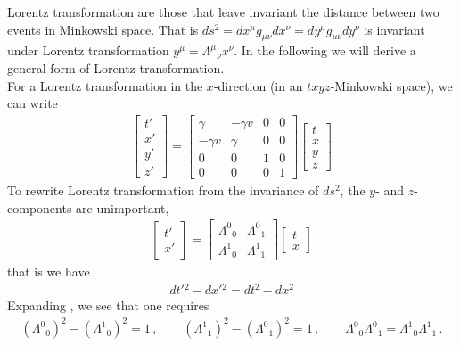 \documentclass[11pt, onesided]{book}
\theoremstyle{break}
\theoremstyle{break}
\newcommand{\bmat}[1]{\begin{bmatrix} #1 \end{bmatrix}}
\begin{document}
Lorentz transformation are those that leave invariant the distance between two events in Minkowski space. That is $ds^2 = dx^\mu g_{\mu\nu}dx^\nu = dy^\mu g_{\mu\nu}dy^\nu$ is invariant under Lorentz transformation $y^\mu = \Lambda^\mu{}_\nu x^\nu$. In the following we will derive a general form of Lorentz transformation.\\

For a Lorentz transformation in the $x$-direction (in an $txyz$-Minkowski space), we can write
\begin{align*}
\bmat{t'\\x'\\y'\\z'} = 
\bmat{\gamma & -\gamma v & 0 & 0\\ 
-\gamma v & \gamma & 0 & 0 \\
0 & 0 & 1 & 0\\
0 & 0 & 0 & 1}
\bmat{t \\x \\y \\z}
\end{align*}
To rewrite Lorentz transformation from the invariance of $ds^2$, the $y$- and $z$-components are unimportant, 
\begin{align}
\bmat{t' \\ x'} = \bmat{\Lambda^0{}_0 & \Lambda^0{}_1 \\ \Lambda^1{}_0 & \Lambda^1{}_1}\bmat{t \\ x}
\end{align}
that is we have
\begin{align*}
dt'{}^2 - dx'{}^2 = dt^2 - dx^2
\end{align*}
Expanding , we see that one requires
\begin{align*}
(\Lambda^0{}_0)^2 - (\Lambda^1{}_0)^2 = 1\,,\qquad (\Lambda^1{}_1)^2 - (\Lambda^0{}_1)^2 = 1 \,,\qquad \Lambda^0{}_0 \Lambda^0{}_1 = \Lambda^1{}_0 \Lambda^1{}_1\,.
\end{align*}
\end{document}

